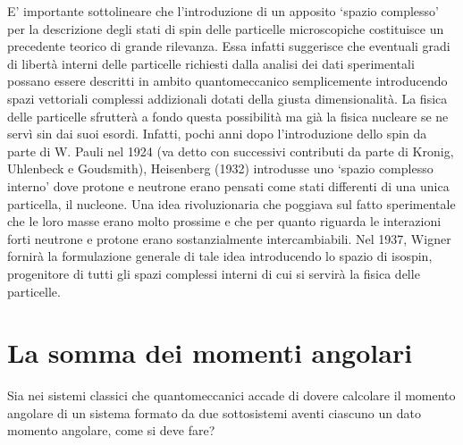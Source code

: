 E’ importante sottolineare che l’introduzione di un apposito ‘spazio complesso’ per la descrizione degli stati di spin
delle particelle microscopiche costituisce un precedente teorico di grande rilevanza.
Essa infatti suggerisce che eventuali gradi di libertà interni delle particelle richiesti dalla analisi dei dati sperimentali
possano essere descritti in ambito quantomeccanico semplicemente introducendo spazi vettoriali complessi addizionali dotati della giusta dimensionalità.
La fisica delle particelle sfrutterà a fondo questa possibilità ma già la fisica nucleare se ne servì sin dai suoi esordi.
Infatti, pochi anni dopo l’introduzione dello spin da parte di W. Pauli nel 1924 (va detto con successivi contributi da parte di Kronig, Uhlenbeck e Goudsmith),
Heisenberg (1932) introdusse uno ‘spazio complesso interno’ dove protone e neutrone erano pensati come stati differenti di una unica particella, il nucleone.
Una idea rivoluzionaria che poggiava sul fatto sperimentale che le loro masse erano molto prossime e che per quanto riguarda le interazioni forti neutrone e protone erano sostanzialmente intercambiabili.
Nel 1937, Wigner fornirà la formulazione generale di tale idea introducendo lo spazio di isospin, progenitore di tutti gli spazi complessi interni di cui si servirà la fisica delle particelle.

\section{La somma dei momenti angolari}\label{sec:somma-dei-momenti-angolari}

Sia nei sistemi classici che quantomeccanici accade di dovere calcolare
il momento angolare di un sistema formato da due sottosistemi aventi
ciascuno un dato momento angolare, come si deve fare?

